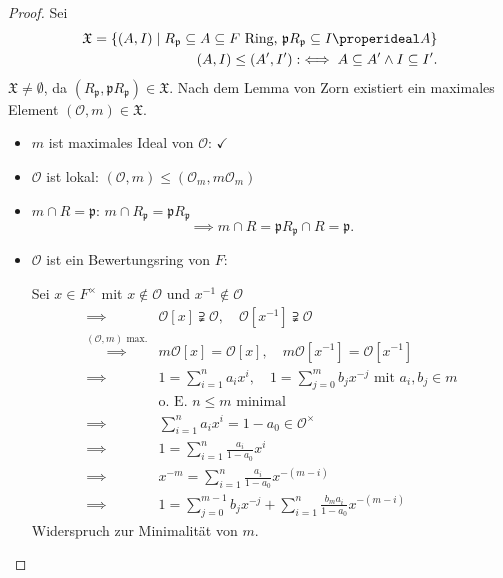 \begin{proof}
    Sei 
    \begin{align*}
        \mathfrak{X}=\{(A,I) \mid R_\mathfrak{p} \subseteq A \subseteq F \text{ Ring, } \mathfrak{p}R_\mathfrak{p} \subseteq I \properideal A\}\\
        (A,I) \leq (A',I') : \iff A \subseteq A' \land I \subseteq I'.
    \end{align*}
    $\mathfrak{X} \ne \emptyset$, da $(R_{\mathfrak{p}}, \mathfrak{p}R_\mathfrak{p}) \in \mathfrak{X}$.
    Nach dem Lemma von Zorn existiert ein maximales Element $(\mathcal{O}, m) \in \mathfrak{X}$.
    \begin{itemize}
        \item $m$ ist maximales Ideal von $\mathcal{O}$: $\checkmark$
        \item $\mathcal{O}$ ist lokal: $(\mathcal{O}, m) \leq (\mathcal{O}_m,m\mathcal{O}_m) $
        \item $m \cap R = \mathfrak{p}$: $m \cap R_\mathfrak{p} = \mathfrak{p}R_\mathfrak{p}$
        $$ \implies m \cap R = \mathfrak{p}R_\mathfrak{p} \cap R = \mathfrak{p}.$$
        \item $\mathcal{O}$ ist ein Bewertungsring von $F$:
        
        Sei $x \in F^\times$ mit $x \notin \mathcal{O}$ und $x^{-1} \notin \mathcal{O}$
        \begin{align*}
            \implies & \mathcal{O}[x] \supsetneqq \mathcal{O},\quad \mathcal{O}[x^{-1}] \supsetneqq \mathcal{O}\\
            \stackrel{(\mathcal{O},m) \text{ max.}}{\implies}& m\mathcal{O}[x] = \mathcal{O}[x], \quad m\mathcal{O}[x^{-1}]= \mathcal{O}[x^{-1}]\\
            \implies & 1 = \sum\limits_{i=1}^n a_ix^i, \quad 1 = \sum\limits_{j=0}^m b_jx^{-j} \text{ mit } a_i,b_j \in m\\
            &\text{o. E. } n\leq m \text{ minimal}\\
            \implies & \sum\limits_{i=1}^n a_ix^i = 1 - a_0 \in \mathcal{O}^\times \\
            \implies & 1 = \sum\limits_{i=1}^n \frac{a_i}{1 - a_0} x^i\\
            \implies & x^{-m} = \sum\limits_{i=1}^n \frac{a_i}{1-a_0} x ^{-(m-i)}\\
            \implies & 1 = \sum\limits_{j=0}^{m-1} b_j x^{-j} + \sum\limits_{i=1}^n \frac{b_ma_i}{1-a_0}x^{-(m-i)}
        \end{align*}
        Widerspruch zur Minimalität von $m$.
    \end{itemize}
\end{proof}

